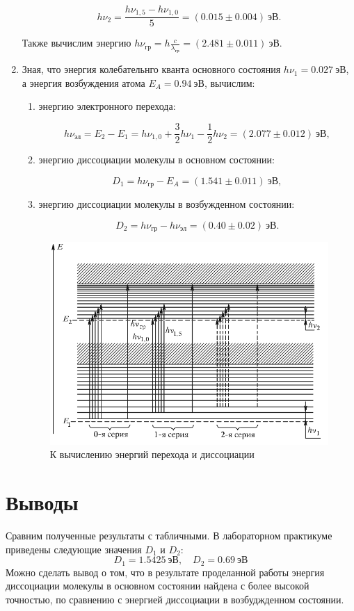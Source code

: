 \documentclass[14pt, a4paper]{report}
\begin{document}
\begin{enumerate}
\[h\nu_2=\frac{h\nu_{1,5}-h\nu_{1,0}}{5}=(0.015\pm0.004)\ эВ.\]

Также вычислим энергию $h\nu_{гр}=h\frac{c}{\lambda_{гр}}=(2.481\pm0.011)\ эВ$.

\item Зная, что энергия колебательнго кванта основного состояния $h\nu_1=0.027\ эВ$, а энергия возбуждения атома $E_A=0.94\ эВ$, вычислим:

\begin{enumerate}

\item энергию электронного перехода:

\[h\nu_{эл}=E_2-E_1=h\nu_{1,0}+\frac{3}{2}h\nu_{1}-\frac{1}{2}h\nu_{2}=(2.077\pm0.012)\ эВ,\]

\item энергию диссоциации молекулы в основном состоянии:

\[D_1=h\nu_{гр}-E_A=(1.541\pm0.011)\ эВ,\]

\item энергию диссоциации молекулы в возбужденном состоянии:

\[D_2=h\nu_{гр}-h\nu_{эл}=(0.40\pm0.02)\ эВ.\]

\end{enumerate}

\begin{figure}[H]
\centering
\includegraphics[scale=0.6]{../images/523-4}
\caption{К вычислению энергий перехода и диссоциации}
\end{figure}

\end{enumerate}

\section{Выводы}

Сравним полученные результаты с табличными. В лабораторном практикуме приведены следующие значения $D_1$ и $D_2$:
\[D_1=1.5425\ эВ,\quad D_2=0.69\ эВ\]
Можно сделать вывод о том, что в результате проделанной работы энергия диссоциации молекулы в основном состоянии найдена с более высокой точностью, по сравнению с энергией диссоциации в возбуджденном состоянии.
\end{document}
